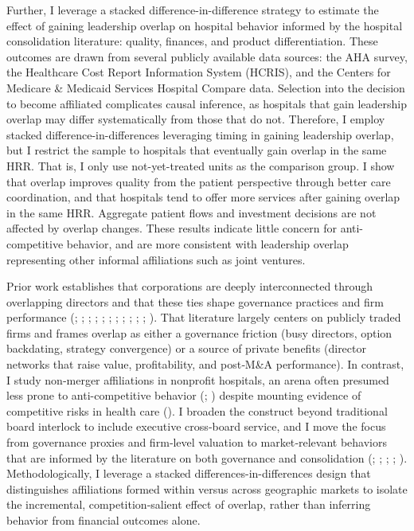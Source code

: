 \documentclass[12pt]{article}
\begin{document}
    Further, I leverage a stacked difference-in-difference strategy to estimate the effect of gaining leadership overlap on hospital behavior informed by the hospital consolidation literature: quality, finances, and product differentiation. These outcomes are drawn from several publicly available data sources: the AHA survey, the Healthcare Cost Report Information System (HCRIS), and the Centers for Medicare \& Medicaid Services Hospital Compare data. Selection into the decision to become affiliated complicates causal inference, as hospitals that gain leadership overlap may differ systematically from those that do not. Therefore, I employ stacked difference-in-differences leveraging timing in gaining leadership overlap, but I restrict the sample to hospitals that eventually gain overlap in the same HRR. That is, I only use not-yet-treated units as the comparison group. I show that overlap improves quality from the patient perspective through better care coordination, and that hospitals tend to offer more services after gaining overlap in the same HRR. Aggregate patient flows and investment decisions are not affected by overlap changes. These results indicate little concern for anti-competitive behavior, and are more consistent with leadership overlap representing other informal affiliations such as joint ventures. 

    Prior work establishes that corporations are deeply interconnected through overlapping directors and that these ties shape governance practices and firm performance (\cite{dooley1969interlocking}; \cite{ferris2003too}; \cite{field2013busy}; \cite{bizjak2009option}; \cite{bouwman2011corporate}; \cite{chiu2013board}; \cite{cai2014board}; \cite{baran2017director}; \cite{geng2021does}; \cite{schonlau2009board}; \cite{cai2012board}; \cite{cheng2021social}). That literature largely centers on publicly traded firms and frames overlap as either a governance friction (busy directors, option backdating, strategy convergence) or a source of private benefits (director networks that raise value, profitability, and post‑M\&A performance). In contrast, I study non‑merger affiliations in nonprofit hospitals, an arena often presumed less prone to anti-competitive behavior (\cite{baer2014clayton}; \cite{aai2013section7}) despite mounting evidence of competitive risks in health care (\cite{hulver2023ftc}). I broaden the construct beyond traditional board interlock to include executive cross‑board service, and I move the focus from governance proxies and firm‑level valuation to market‑relevant behaviors that are informed by the literature on both governance and consolidation (\cite{baran2017director}; \cite{geng2021does}; \cite{schonlau2009board}; \cite{cai2012board}; \cite{cheng2021social}). Methodologically, I leverage a stacked differences-in-differences design that distinguishes affiliations formed within versus across geographic markets to isolate the incremental, competition‑salient effect of overlap, rather than inferring behavior from financial outcomes alone. 
\end{document}
